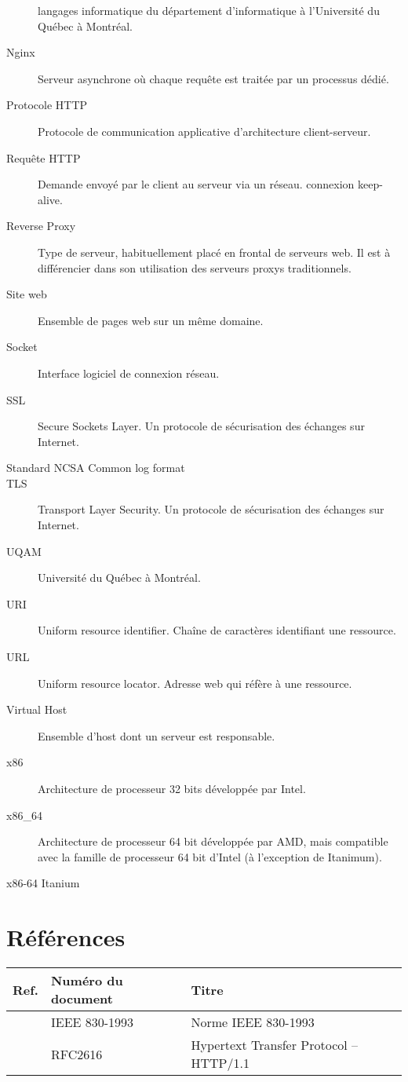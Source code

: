 \documentclass{scrreprt}
\begin{document}
\begin{description}
langages informatique du département d'informatique à l'Université du Québec à
Montréal.
	\item[Nginx] Serveur asynchrone où chaque requête est traitée par un processus dédié.   
	\item[Protocole HTTP] Protocole de communication applicative d'architecture
client-serveur\cite{http}.
	\item[Requête HTTP] Demande envoyé par le client au serveur via un réseau.
connexion keep-alive\cite{http1.0}.
	\item[Reverse Proxy] Type de serveur, habituellement placé en frontal de serveurs web. Il est à différencier dans son utilisation des serveurs proxys traditionnels.
    \item[Site web] Ensemble de pages web sur un même domaine.
	\item[Socket] Interface logiciel de connexion réseau.   
    \item[SSL] Secure Sockets Layer. Un protocole de sécurisation des échanges sur Internet.
	\item[Standard NCSA Common log format]  
    \item[TLS] Transport Layer Security. Un protocole de sécurisation des échanges sur Internet. 
    \item[UQAM] Université du Québec à Montréal.    
    \item[URI] Uniform resource identifier. Chaîne de caractères identifiant une ressource.
    \item[URL] Uniform resource locator. Adresse web qui réfère à une ressource.
    \item[Virtual Host] Ensemble d'host dont un serveur est responsable.
    \item[x86] Architecture de processeur 32 bits développée par Intel.
    \item[x86_64] Architecture de processeur 64 bit développée par AMD, mais compatible avec la famille de processeur 64 bit d'Intel (à l'exception de Itanimum).
    \item[x86-64 Itanium]
\end{description}

\section{Références}
\begin{tabularx}{\textwidth}{|l|X|l|}
    \hline
    Ref. & Numéro du document & Titre \\
    \hline
    \cite{ieefr} & IEEE 830-1993 & Norme IEEE 830-1993 \\
    \hline
    \cite{http} & RFC2616 & Hypertext Transfer Protocol -- HTTP/1.1 \\
    \hline
\end{tabularx}
\end{document}

